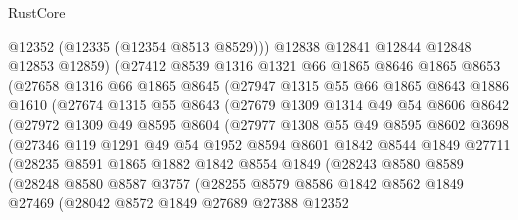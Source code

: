 \begin{lexlean}{RustCore}
\begin{coremodule}
              @12352
              (@12335 (@12354 @8513 @8529)))
            @12838
            @12841
            @12844
            @12848
            @12853
            @12859)
          (@27412
            @8539
            @1316
            @1321
            @66
            @1865
            @8646
            @1865
            @8653
            (@27658
              @1316
              @66
              @1865
              @8645
              (@27947
                @1315
                @55
                @66
                @1865
                @8643
                @1886
                @1610
                (@27674
                  @1315
                  @55
                  @8643
                  (@27679
                    @1309
                    @1314
                    @49
                    @54
                    @8606
                    @8642
                    (@27972
                      @1309
                      @49
                      @8595
                      @8604
                      (@27977
                        @1308
                        @55
                        @49
                        @8595
                        @8602
                        @3698
                        (@27346
                          @119
                          @1291
                          @49
                          @54
                          @1952
                          @8594
                          @8601
                          @1842
                          @8544
                          @1849
                          @27711
                          (@28235
                            @8591
                            @1865
                            @1882
                            @1842
                            @8554
                            @1849
                            (@28243
                              @8580
                              @8589
                              (@28248
                                @8580
                                @8587
                                @3757
                                (@28255
                                  @8579
                                  @8586
                                  @1842
                                  @8562
                                  @1849
                                  @27469
                                  (@28042
                                    @8572
                                    @1849
                                    @27689
                                    @27388
                                    @12352

\end{coremodule}
\end{lexlean}
